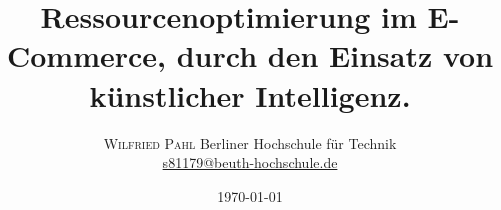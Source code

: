 
\setlength{\droptitle}{-4\baselineskip} %

\pretitle{\begin{center}\Huge\bfseries} %
	\posttitle{\end{center}} %
\title{Ressourcenoptimierung im E-Commerce, durch den Einsatz von künstlicher Intelligenz.} %
\author{%
	\textsc{Wilfried Pahl }%
	\normalsize Berliner Hochschule für Technik \\ %
	\normalsize \href{mailto:s81179@beuth-hochschule.de}{s81179@beuth-hochschule.de} %
}
\date{\today} %


